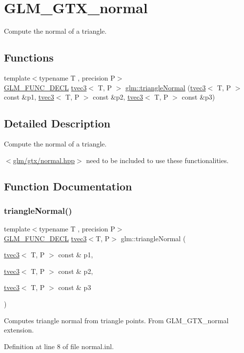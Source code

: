 \hypertarget{group__gtx__normal}{}\section{G\+L\+M\+\_\+\+G\+T\+X\+\_\+normal}
\label{group__gtx__normal}


Compute the normal of a triangle.  


\subsection*{Functions}
\begin{DoxyCompactItemize}
\item 
{\footnotesize template$<$typename T , precision P$>$ }\\\mbox{\hyperlink{setup_8hpp_ab2d052de21a70539923e9bcbf6e83a51}{G\+L\+M\+\_\+\+F\+U\+N\+C\+\_\+\+D\+E\+CL}} \mbox{\hyperlink{structglm_1_1tvec3}{tvec3}}$<$ T, P $>$ \mbox{\hyperlink{group__gtx__normal_ga7842850bcda582f1756883e3ed950e14}{glm\+::triangle\+Normal}} (\mbox{\hyperlink{structglm_1_1tvec3}{tvec3}}$<$ T, P $>$ const \&p1, \mbox{\hyperlink{structglm_1_1tvec3}{tvec3}}$<$ T, P $>$ const \&p2, \mbox{\hyperlink{structglm_1_1tvec3}{tvec3}}$<$ T, P $>$ const \&p3)
\end{DoxyCompactItemize}


\subsection{Detailed Description}
Compute the normal of a triangle. 

$<$\mbox{\hyperlink{normal_8hpp}{glm/gtx/normal.\+hpp}}$>$ need to be included to use these functionalities. 

\subsection{Function Documentation}
\mbox{\label{group__gtx__normal_ga7842850bcda582f1756883e3ed950e14}} 
\subsubsection{\texorpdfstring{triangleNormal()}{triangleNormal()}}
{\footnotesize\ttfamily template$<$typename T , precision P$>$ \\
\mbox{\hyperlink{setup_8hpp_ab2d052de21a70539923e9bcbf6e83a51}{G\+L\+M\+\_\+\+F\+U\+N\+C\+\_\+\+D\+E\+CL}} \mbox{\hyperlink{structglm_1_1tvec3}{tvec3}}$<$T, P$>$ glm\+::triangle\+Normal (\begin{DoxyParamCaption}\item[{\mbox{\hyperlink{structglm_1_1tvec3}{tvec3}}$<$ T, P $>$ const \&}]{p1,  }\item[{\mbox{\hyperlink{structglm_1_1tvec3}{tvec3}}$<$ T, P $>$ const \&}]{p2,  }\item[{\mbox{\hyperlink{structglm_1_1tvec3}{tvec3}}$<$ T, P $>$ const \&}]{p3 }\end{DoxyParamCaption})}

Computes triangle normal from triangle points. From G\+L\+M\+\_\+\+G\+T\+X\+\_\+normal extension. 

Definition at line 8 of file normal.\+inl.

